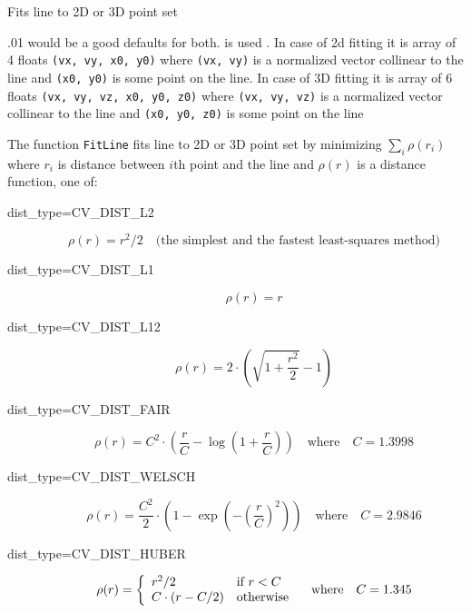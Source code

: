 \label{FitLine}

Fits line to 2D or 3D point set


\begin{description}
.01 would be a good defaults for both. is used
. In case of 2d fitting it is array of 4 floats \texttt{(vx, vy, x0, y0)} where \texttt{(vx, vy)} is a normalized vector collinear to the line and \texttt{(x0, y0)} is some point on the line. In case of 3D fitting it is array of 6 floats \texttt{(vx, vy, vz, x0, y0, z0)} where \texttt{(vx, vy, vz)} is a normalized vector collinear to the line and \texttt{(x0, y0, z0)} is some point on the line
\end{description}

The function \texttt{FitLine} fits line to 2D or 3D point set by minimizing $\sum_i \rho(r_i)$ where $r_i$ is distance between $i$th point and the line and $\rho(r)$ is a distance function, one of:

\begin{description}

\item[dist\_type=CV\_DIST\_L2]
\[ \rho(r) = r^2/2 \quad \text{(the simplest and the fastest least-squares method)} \]

\item[dist\_type=CV\_DIST\_L1]
\[ \rho(r) = r \]

\item[dist\_type=CV\_DIST\_L12]
\[ \rho(r) = 2 \cdot (\sqrt{1 + \frac{r^2}{2}} - 1) \]

\item[dist\_type=CV\_DIST\_FAIR]
\[ \rho\left(r\right) = C^2 \cdot \left( \frac{r}{C} - \log{\left(1 + \frac{r}{C}\right)}\right) \quad \text{where} \quad C=1.3998 \]

\item[dist\_type=CV\_DIST\_WELSCH]
\[ \rho\left(r\right) = \frac{C^2}{2} \cdot \left( 1 - \exp{\left(-\left(\frac{r}{C}\right)^2\right)}\right) \quad \text{where} \quad C=2.9846 \]

\item[dist\_type=CV\_DIST\_HUBER]
\[ \rho(r) = \left\{ \begin{array}{l l} r^2/2 & \mbox{if $r < C$}\\ C \cdot (r-C/2) & \mbox{otherwise}\\ \end{array} \right.  \quad \text{where} \quad C=1.345
\]
\end{description}

